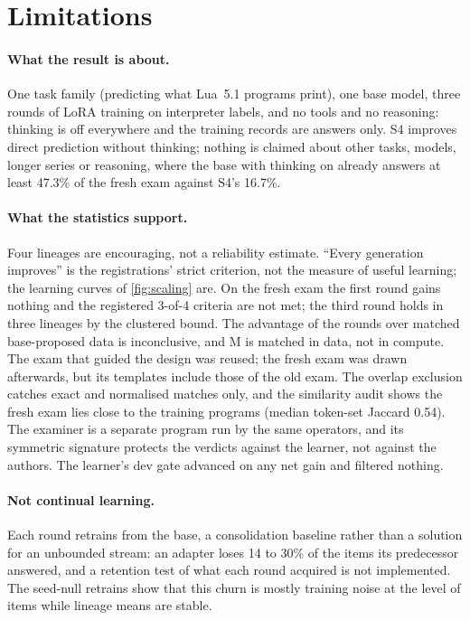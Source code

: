 
\section{Limitations}\label{sec:limitations}

\paragraph{What the result is about.} One task family (predicting what Lua~5.1 programs print), one base
model, three rounds of LoRA training on interpreter labels, and no tools and no reasoning: thinking is
off everywhere and the training records are answers only. S4 improves direct prediction without
thinking; nothing is claimed about other tasks, models, longer series or reasoning, where the base with
thinking on already answers at least 47.3\% of the fresh exam against S4's 16.7\%.

\paragraph{What the statistics support.} Four lineages are encouraging, not a reliability estimate.
``Every generation improves'' is the registrations' strict criterion, not the measure of useful learning;
the learning curves of \cref{fig:scaling} are. On the fresh exam the first round gains nothing and the
registered 3-of-4 criteria are not met; the third round holds in three lineages by the clustered bound.
The advantage of the rounds over matched base-proposed data is inconclusive, and M is matched in data,
not in compute. The exam that guided the design was reused; the fresh exam was drawn
afterwards, but its templates include those of the old exam. The overlap exclusion catches
exact and normalised matches only, and the similarity audit shows the fresh exam lies close to the
training programs (median token-set Jaccard 0.54). The examiner is a separate program run by the
same operators, and its symmetric signature protects the verdicts against the learner, not against the
authors. The learner's dev gate advanced on any net gain and filtered nothing.

\paragraph{Not continual learning.} Each round retrains from the base, a consolidation baseline rather
than a solution for an unbounded stream: an adapter loses 14 to 30\% of the items its predecessor
answered, and a retention test of what each round acquired is not implemented. The seed-null retrains
show that this churn is mostly training noise at the level of items while lineage means are
stable.

